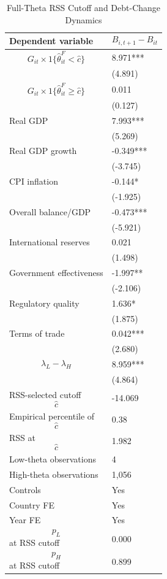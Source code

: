 \begin{table}[H]\centering
\begin{threeparttable}
\caption{Full-Theta RSS Cutoff and Debt-Change Dynamics}
\label{tab:deltaB_rss_cutoff_fulltheta}
\scriptsize
\begin{tabularx}{\textwidth}{lY}
\toprule
Dependent variable & $$B_{i,t+1}-B_{it}$$ \\
\midrule
$$G_{it}\times 1\{\widehat{\theta}^{F}_{it}<\widehat{c}\}$$ & 8.971*** \\
 & (4.891) \\
$$G_{it}\times 1\{\widehat{\theta}^{F}_{it}\geq\widehat{c}\}$$ & 0.011 \\
 & (0.127) \\
Real GDP & 7.993*** \\
 & (5.269) \\
Real GDP growth & -0.349*** \\
 & (-3.745) \\
CPI inflation & -0.144* \\
 & (-1.925) \\
Overall balance/GDP & -0.473*** \\
 & (-5.921) \\
International reserves & 0.021 \\
 & (1.498) \\
Government effectiveness & -1.997** \\
 & (-2.106) \\
Regulatory quality & 1.636* \\
 & (1.875) \\
Terms of trade & 0.042*** \\
 & (2.680) \\
$$\lambda_L-\lambda_H$$ & 8.959*** \\
 & (4.864) \\
\midrule
RSS-selected cutoff $$\widehat{c}$$ & -14.069 \\
Empirical percentile of $$\widehat{c}$$ & 0.38 \\
RSS at $$\widehat{c}$$ & 1.982 \\
Low-theta observations & 4 \\
High-theta observations & 1,056 \\
Controls & Yes \\
Country FE & Yes \\
Year FE & Yes \\
$$p_L$$ at RSS cutoff & 0.000 \\
$$p_H$$ at RSS cutoff & 0.899 \\

\end{tabularx}
\end{threeparttable}
\end{table}
